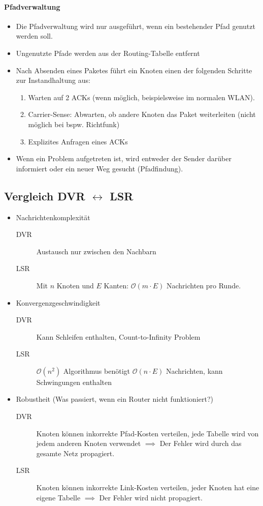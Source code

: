 			\paragraph{Pfadverwaltung}
				\begin{itemize}
					\item Die Pfadverwaltung wird nur ausgeführt, wenn ein bestehender Pfad genutzt werden soll.
					\item Ungenutzte Pfade werden aus der Routing-Tabelle entfernt
					\item Nach Absenden eines Paketes führt ein Knoten einen der folgenden Schritte zur Instandhaltung aus:
						\begin{enumerate}
							\item Warten auf 2 ACKs (wenn möglich, beispielsweise im normalen WLAN).
							\item Carrier-Sense: Abwarten, ob andere Knoten das Paket weiterleiten (nicht möglich bei bspw. Richtfunk)
							\item Explizites Anfragen eines ACKs
						\end{enumerate}
					\item Wenn ein Problem aufgetreten ist, wird entweder der Sender darüber informiert oder ein neuer Weg gesucht (Pfadfindung).
				\end{itemize}

		\subsection{Vergleich DVR \(\leftrightarrow\) LSR}
			\begin{itemize}
				\item Nachrichtenkomplexität
					\begin{description}
						\item[DVR] Austausch nur zwischen den Nachbarn
						\item[LSR] Mit \(n\) Knoten und \(E\) Kanten: \(\mathcal{O}(m \cdot E)\) Nachrichten pro Runde.
					\end{description}
				\item Konvergenzgeschwindigkeit
					\begin{description}
						\item[DVR] Kann Schleifen enthalten, Count-to-Infinity Problem
						\item[LSR] \(\mathcal{O}(n^2)\) Algorithmus benötigt \(\mathcal{O}(n \cdot E)\) Nachrichten, kann Schwingungen enthalten
					\end{description}
				\item Robustheit (Was passiert, wenn ein Router nicht funktioniert?)
					\begin{description}
						\item[DVR] Knoten können inkorrekte Pfad-Kosten verteilen, jede Tabelle wird von jedem anderen Knoten verwendet \(\implies\) Der Fehler wird durch das gesamte Netz propagiert.
						\item[LSR] Knoten können inkorrekte Link-Kosten verteilen, jeder Knoten hat eine eigene Tabelle \(\implies\) Der Fehler wird nicht propagiert.
					\end{description}
			\end{itemize}

